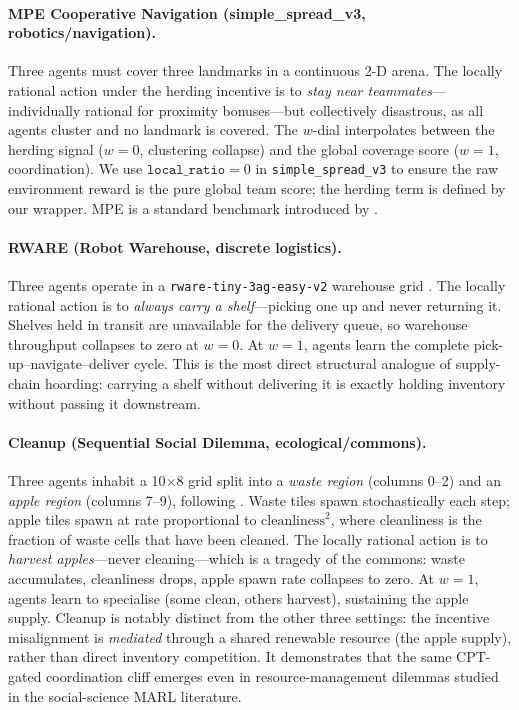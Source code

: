 \documentclass[11pt]{article}
\begin{document}
\paragraph{MPE Cooperative Navigation (simple\_spread\_v3, robotics/navigation).}
Three agents must cover three landmarks in a continuous 2-D arena.
The locally rational action under the herding incentive is to
\emph{stay near teammates}---individually rational for proximity bonuses---but
collectively disastrous, as all agents cluster and no landmark is covered.
The $w$-dial interpolates between the herding signal ($w{=}0$, clustering collapse)
and the global coverage score ($w{=}1$, coordination).
We use $\texttt{local\_ratio}{=}0$ in \texttt{simple\_spread\_v3} to ensure the
raw environment reward is the pure global team score; the herding term is defined
by our wrapper.
MPE is a standard benchmark introduced by \citet{lowe2017multi}.

\paragraph{RWARE (Robot Warehouse, discrete logistics).}
Three agents operate in a \texttt{rware-tiny-3ag-easy-v2} warehouse grid
\citep{christianos2020shared}.
The locally rational action is to \emph{always carry a shelf}---picking one up
and never returning it.
Shelves held in transit are unavailable for the delivery queue, so warehouse
throughput collapses to zero at $w{=}0$.
At $w{=}1$, agents learn the complete pick-up--navigate--deliver cycle.
This is the most direct structural analogue of supply-chain hoarding:
carrying a shelf without delivering it is exactly holding inventory without
passing it downstream.

\paragraph{Cleanup (Sequential Social Dilemma, ecological/commons).}
Three agents inhabit a 10$\times$8 grid split into a \emph{waste region} (columns
0--2) and an \emph{apple region} (columns 7--9), following \citet{leibo2017multi}.
Waste tiles spawn stochastically each step; apple tiles spawn at rate proportional
to $\text{cleanliness}^2$, where cleanliness is the fraction of waste cells that
have been cleaned.
The locally rational action is to \emph{harvest apples}---never cleaning---which
is a tragedy of the commons: waste accumulates, cleanliness drops, apple spawn
rate collapses to zero.
At $w{=}1$, agents learn to specialise (some clean, others harvest), sustaining
the apple supply.
Cleanup is notably distinct from the other three settings: the incentive
misalignment is \emph{mediated} through a shared renewable resource (the apple
supply), rather than direct inventory competition.
It demonstrates that the same CPT-gated coordination cliff emerges even in
resource-management dilemmas studied in the social-science MARL literature.
\end{document}
